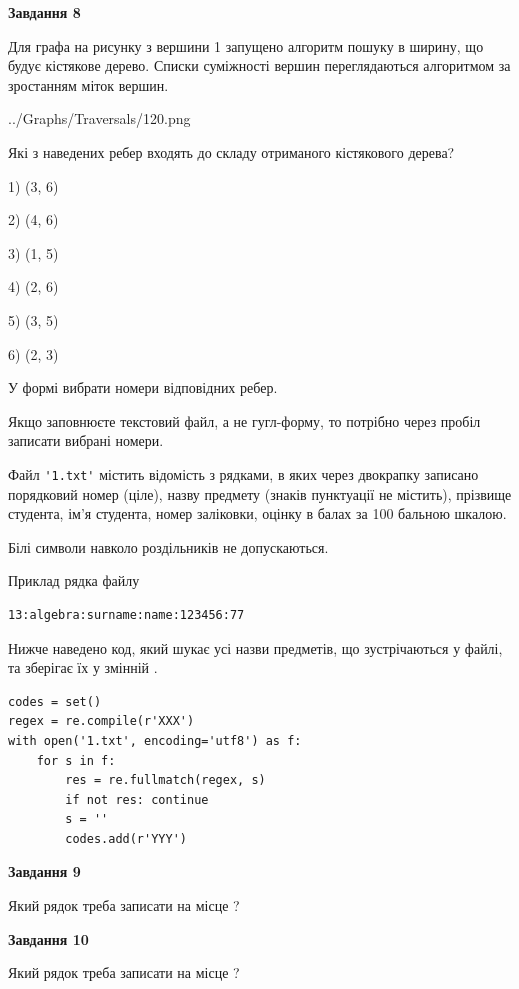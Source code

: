 \documentclass[12pt, ukrainian]{article}
\def\code#1{\Verb!#1!}
\begin{document}
{\begin {large}
{\begin {center}\textbf{Завдання 8}\end {center}}\par
Для графа на рисунку з вершини 1 запущено алгоритм пошуку в ширину, що будує кістякове дерево. Списки суміжності вершин переглядаються алгоритмом за зростанням міток вершин.\par
\begin{center}
	{../Graphs/Traversals/120.png}
\end{center}
\par Які з наведених ребер входять до складу отриманого кістякового дерева?\par
1) (3, 6)\par
2) (4, 6)\par
3) (1, 5)\par
4) (2, 6)\par
5) (3, 5)\par
6) (2, 3)\par
{\vskip 15pt} У формі вибрати номери відповідних ребер.


Якщо заповнюєте текстовий файл, а не гугл-форму, то потрібно через пробіл записа\-ти вибрані номери.\par
\newpage


Файл \code{'1.txt'} містить відомість з рядками, в яких через двокрапку записано поряд\-ковий номер (ціле), назву предмету (знаків пунктуації не містить), прізвище студента, ім'я студента, номер заліковки, оцінку в балах за 100 бальною шкалою.

Білі символи навколо роздільників не допускаються.

Приклад рядка файлу



\begin{verbatim}
13:algebra:surname:name:123456:77
\end{verbatim}


Нижче наведено код, який шукає усі назви предметів, що зустрічаються у файлі, та зберігає їх у змінній .



\begin{verbatim}
codes = set()
regex = re.compile(r'XXX')
with open('1.txt', encoding='utf8') as f:
    for s in f:
        res = re.fullmatch(regex, s)
        if not res: continue
        s = ''
        codes.add(r'YYY')
\end{verbatim}


{\begin {center}\textbf{Завдання 9}\end {center}}\par
Який рядок треба записати на місце  ?\par
\vspace{5mm}


{\begin {center}\textbf{Завдання 10}\end {center}}\par
Який рядок треба записати на місце  ?\par


\newpage


\end {large}}
\end{document}

